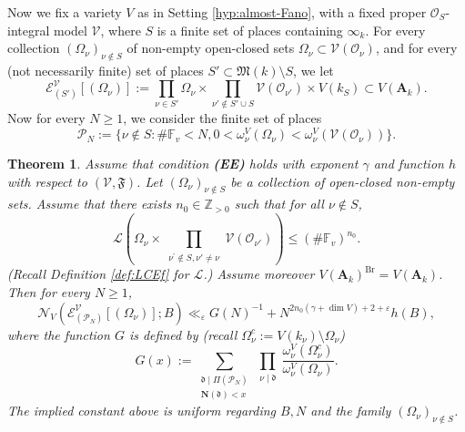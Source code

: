 \documentclass[11pt,letterpaper]{amsart}
\newcommand{\BF}{{\mathbb {F}}}
\newcommand{\BZ}{{\mathbb {Z}}}
\newcommand{\CE}{{\mathcal {E}}}
\newcommand{\CL}{{\mathcal {L}}}
\newcommand{\CN}{{\mathcal {N}}}
\newcommand{\CO}{{\mathcal {O}}}
\newcommand{\CP}{{\mathcal {P}}}
\newcommand{\CV}{{\mathcal {V}}}
\newcommand{\RA}{{\mathbf {A}}}
\theoremstyle{plain}
\numberwithin{equation}{section}
\newtheorem{theorem}{Theorem}[section]
\theoremstyle{definition}
\theoremstyle{remark}
\begin{document}
Now we fix a variety $V$ as in Setting \ref{hyp:almost-Fano}, with a fixed proper $\CO_S$-integral model $\CV$, where $S$  is a finite set of places containing $\infty_k$. For every collection $(\Omega_{\nu})_{\nu\notin S}$ of non-empty open-closed sets $\Omega_\nu\subset \CV(\CO_\nu)$, and for every (not necessarily finite) set of places $S'\subset \mathfrak{M}(k)\setminus S$, we let 
$$\CE^{\CV}_{(S')}[(\Omega_{\nu})]:=\prod_{\nu\in S'}\Omega_\nu\times \prod_{\nu'\notin S'\cup S}\CV(\CO_{\nu'})\times V(k_S)\subset V(\RA_k).$$
  Now for every $N\geqslant 1$, we consider the finite set of places \begin{equation}\label{eq:CPN}
	\CP_N:=\{\nu\notin S:\#\BF_v<N,0<\omega_\nu^V(\Omega_\nu)<\omega_\nu^V( \CV(\CO_\nu))\}.
\end{equation} 
\begin{theorem}\label{thm:Selbergsieve}
	Assume that condition \textbf{(EE)} holds with exponent $\gamma$ and function $h$ with respect to $(\CV,\mathfrak{F})$. Let $(\Omega_\nu)_{\nu\notin S}$ be a collection of open-closed non-empty sets. Assume that there exists $n_0\in\BZ_{>0}$ such that for all $\nu\notin S$, \begin{equation}\label{eq:CLbdk}
		\CL\left(\Omega_{\nu}\times\prod_{\substack{\nu^\prime\notin S,\nu'\neq \nu}}\CV(\CO_{\nu'})\right)\leqslant (\#\BF_v)^{n_0}.
	\end{equation} (Recall Definition \ref{def:LCEf} for $\CL$.) Assume moreover $V(\RA_k)^{\operatorname{Br}}=V(\RA_k)$. Then for every $N\geqslant 1$,
	$$\CN_V(\CE^{\CV}_{(\CP_N)}[(\Omega_\nu)];B)\ll_\varepsilon G(N)^{-1}+N^{2n_0(\gamma+\dim V)+2+\varepsilon} h(B),$$ where the function $G$ is defined by (recall $\Omega_\nu^c:= V(k_\nu)\setminus \Omega_\nu$) \begin{equation}\label{eq:GN}
		G(x):=\sum_{\substack{\mathfrak{d}\mid \Pi(\CP_N)\\\mathbf{N}(\mathfrak{d})<x }}\prod_{\substack{\nu\mid \mathfrak{d}}}\frac{\omega_\nu^V(\Omega_\nu^c)}{\omega_\nu^V(\Omega_\nu)}.
	\end{equation}
 The implied constant above is uniform regarding $B,N$ and the family $(\Omega_\nu)_{\nu\notin S}$.
\end{theorem}
\end{document}
